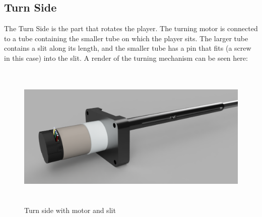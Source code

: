 \subsection{Turn Side}\label{subsec:turn-side}
The Turn Side is the part that rotates the player.
The turning motor is connected to a tube containing the smaller tube on which the player sits.
The larger tube contains a slit along its length, and the smaller tube has a pin that fits (a screw in this case) into the slit.
A render of the turning mechanism can be seen here:
\begin{figure}[H]
    \centering
    \includegraphics[height=7cm]{../photos/turn_side2}
    \caption[turnside]{Turn side with motor and slit}
    \label{fig:turn_side2}
\end{figure}